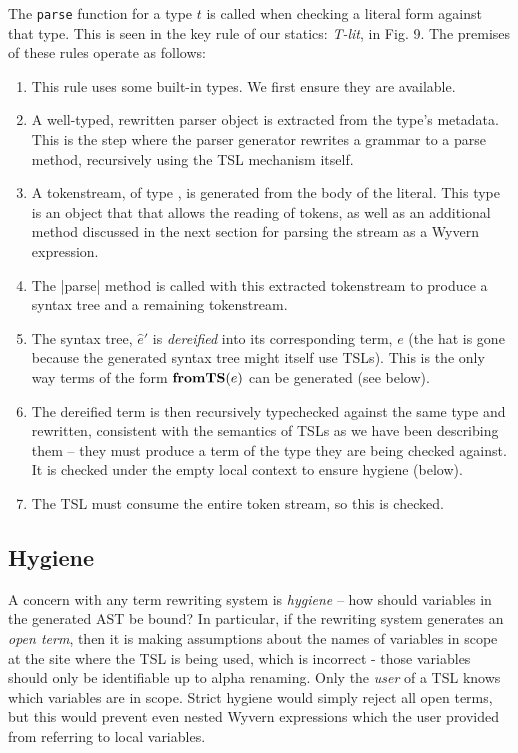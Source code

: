 The \verb|parse| function for a type $t$ is called when checking a literal form against that type. This is seen in the key rule of our statics: \textit{T-lit}, in Fig. 9. The premises of these rules operate as follows:
\begin{enumerate}
\setlength{\itemsep}{1pt}
\item This rule uses some built-in types. We first ensure they are available.
\item A well-typed, rewritten parser object is extracted from the type's metadata. This is the step where the parser generator rewrites a grammar to a parse method, recursively using the TSL mechanism itself.
\item A tokenstream, of type , is generated from the body of the literal. This type is an object that that allows the reading of tokens, as well as an additional method discussed in the next section for parsing the stream as a Wyvern expression.
\item The \li|parse| method is called with this extracted tokenstream to produce a syntax tree and a remaining tokenstream.
\item The syntax tree, $\hat{e}'$ is \emph{dereified} into its corresponding term, $e$ (the hat is gone because the generated syntax tree might itself use TSLs). This is the only way terms of the form $\textbf{fromTS}(e)$ can be generated (see below).
\item The dereified term is then recursively typechecked against the same type and rewritten, consistent with the semantics of TSLs as we have been describing them -- they must produce a term of the type they are being checked against. It is checked under the empty local context to ensure hygiene (below).
\item The TSL must consume the entire token stream, so this is checked.
\end{enumerate}
\subsection{Hygiene}
A concern with any term rewriting system is \emph{hygiene} -- how should variables in the generated AST be bound? In particular, if the rewriting system generates an \emph{open term}, then it is making assumptions about the names of variables in scope at the site where the TSL is being used, which is incorrect - those variables should only be identifiable up to alpha renaming. Only the \emph{user} of a TSL knows which variables are in scope. Strict hygiene would simply reject all open terms, but this would prevent even nested Wyvern expressions which the user provided from referring to local variables.

